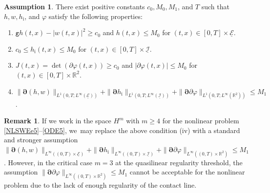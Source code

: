 \documentclass[10pt]{amsart}
\newenvironment{enumeratei}
{\bgroup\def\theenumi{\roman{enumi}}\def\theenumii{\arabic{enumii}}\begin{enumerate}}
{\end{enumerate}\egroup}
\newcommand{\gr}{{\mathtt g}}
\newcommand{\R}{{\mathbb R}}
\newcommand{\cI}{{\mathcal I}}
\newcommand{\cE}{{\mathcal E}}
\newcommand{\ul}[1]{\underline{#1}}
\theoremstyle{definition}
\newtheorem{assumption}[theorem]{Assumption}
\newtheorem{remark}[theorem]{Remark}
\begin{document}
\begin{assumption}\label{ass:LP}
There exist positive constants $c_0, M_0,M_1$, and $T$ such that $h,w,h_\mathrm{i}$, and $\varphi$ satisfy the following properties:
\begin{enumeratei}
\item\label{ass:LPi}
$\gr h(t,x)-|w(t,x)|^2\geq c_0$ and $h(t,x)\leq M_0$ for $(t,x)\in[0,T]\times\ul{\cE}$.
\item\label{ass:LPii}
$c_0 \leq h_\mathrm{i}(t,x) \leq M_0$ for $(t,x)\in[0,T]\times\ul{\cI}$.
\item\label{ass:LPiii}
$J(t,x)=\det(\partial\varphi(t,x))\geq c_0$ and $|\partial\varphi(t,x)|\leq M_0$ for $(t,x)\in[0,T]\times\R^2$.
\item\label{ass:LPiv}
$\|\bm{\partial}(h,w)\|_{L^1(0,T;L^\infty(\ul{\cE}))} + \|\bm{\partial} h_\mathrm{i}\|_{L^1(0,T;L^\infty(\ul{\cI}))}
+ \|\bm{\partial}\partial\varphi\|_{L^1(0,T;L^\infty(\R^2))} \leq M_1$.
\end{enumeratei}
\end{assumption}

\begin{remark}
If we work in the space $H^m$ with $m\geq4$ for the nonlinear problem \eqref{NLSWEe5}--\eqref{ODE5}, we~may replace the above condition {\rm (iv)}
with a standard and stronger assumption $\|\bm{\partial}(h,w)\|_{L^\infty((0,T)\times\ul{\cE})} + \|\bm{\partial} h_\mathrm{i}\|_{L^\infty((0,T)\times\ul{\cI})}
+ \|\bm{\partial}\partial\varphi\|_{L^\infty((0,T)\times\R^2)} \leq M_1$.
However, in the critical case $m=3$ at the quasilinear regularity threshold, the assumption $\|\bm{\partial}\partial\varphi\|_{L^\infty((0,T)\times\R^2)} \leq M_1$
cannot be acceptable for the nonlinear problem due to the lack of enough regularity of the contact line.
\end{remark}
\end{document}

